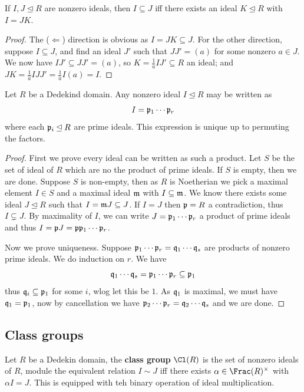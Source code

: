 \documentclass{article}
\begin{document}
\begin{corollary}
    If $I,J\unlhd R$ are nonzero ideals, then $I\subseteq J$ iff there exists an ideal $K\unlhd R$ with $I=JK$.
    \begin{proof}
        The ($\Leftarrow$) direction is obvious as $I=JK\subseteq J$. For the other direction, suppose $I\subseteq J$, and find an ideal $J'$ such that $JJ'=(a)$ for some nonzero $a\in J$. We now have $IJ'\subseteq JJ' = (a)$, so $K=\frac{1}{a}IJ'\subseteq R$ an ideal; and $JK = \frac{1}{a}IJJ'=\frac{1}{a}I(a)=I$.
    \end{proof}
\end{corollary}

\begin{theorem}
    Let $R$ be a Dedekind domain. Any nonzero ideal $I\unlhd R$ may be written as \[
    I = \mathfrak{p}_1\cdots\mathfrak{p}_r
    \] where each $\mathfrak{p}_i\unlhd R$ are prime ideals. This expression is unique up to permuting the factors.
    \begin{proof}
        First we prove every ideal can be written as such a product. Let $S$ be the set of ideal of $R$ which are no the product of prime ideals. If $S$ is empty, then we are done. Suppose $S$ is non-empty, then as $R$ is Noetherian we pick a maximal element $I\in S$ and a maximal ideal $\mathfrak{m}$ with $I\subseteq \mathfrak{m}$. We know there exists some ideal $J\unlhd R$ such that $I=\mathfrak{m} J\subseteq J$. If $I=J$ then $\mathfrak{p}=R$ a contradiction, thus $I\subsetneq J$. By maximality of $I$, we can write $J=\mathfrak{p}_1\cdots\mathfrak{p}_r$ a product of prime ideals and thus $I=\mathfrak{p} J = \mathfrak{p}\mathfrak{p}_1\cdots\mathfrak{p}_r$.

        Now we prove uniqueness. Suppose $\mathfrak{p}_1\cdots\mathfrak{p}_r=\mathfrak{q}_1\cdots\mathfrak{q}_s$ are products of nonzero prime ideals. We do induction on $r$. We have \[
        \mathfrak{q}_1\cdots\mathfrak{q}_s = \mathfrak{p}_1\cdots\mathfrak{p}_r\subseteq \mathfrak{p}_1
        \] thus $\mathfrak{q}_i\subseteq\mathfrak{p}_1$ for some $i$, wlog let this be $1$. As $\mathfrak{q}_1$ is maximal, we must have $\mathfrak{q}_1=\mathfrak{p}_1$, now by cancellation we have $\mathfrak{p}_2\cdots\mathfrak{p}_r=\mathfrak{q}_2\cdots\mathfrak{q}_s$ and we are done.
    \end{proof}
\end{theorem}

\subsection{Class groups}

\begin{definition}
    Let $R$ be a Dedekin domain, the \textbf{class group} $\Cl(R)$ is the set of nonzero ideals of $R$, module the equivalent relation $I\sim J$ iff there exists $\alpha\in\Frac(R)^\times$ with $\alpha I=J$. This is equipped with teh binary operation of ideal multiplication.
\end{definition}
\end{document}

